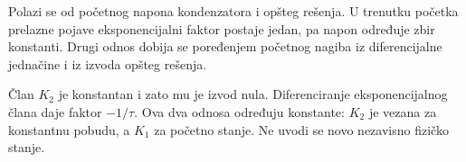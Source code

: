 Polazi se od početnog napona kondenzatora i opšteg rešenja. U trenutku početka prelazne pojave eksponencijalni faktor postaje jedan, pa napon određuje zbir konstanti. Drugi odnos dobija se poređenjem početnog nagiba iz diferencijalne jednačine i iz izvoda opšteg rešenja.

Član $K_2$ je konstantan i zato mu je izvod nula. Diferenciranje eksponencijalnog člana daje faktor $-1/\tau$. Ova dva odnosa određuju konstante: $K_2$ je vezana za konstantnu pobudu, a $K_1$ za početno stanje. Ne uvodi se novo nezavisno fizičko stanje.
